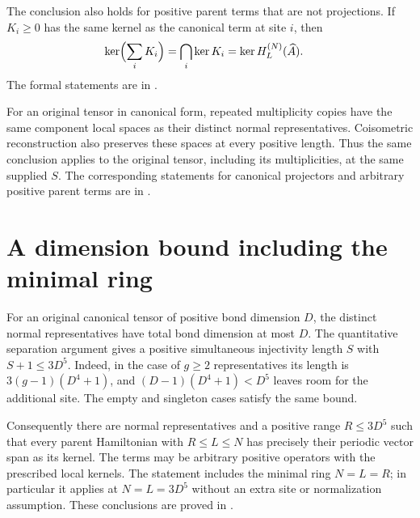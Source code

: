 \documentclass{article}
\begin{document}
The conclusion also holds for positive parent terms that are not
projections. If $K_i\geq0$ has the same kernel as the canonical term at
site $i$, then
\begin{align}
  \ker\Bigl(\sum_i K_i\Bigr)
  &=\bigcap_i\ker K_i=\ker H_L^{(N)}(\widehat A).
  \label{eq:cpgsv21_block_diagonal_parent_ground_space_positive_kernel_sum}
\end{align}
The formal statements are in
.

For an original tensor in canonical form, repeated multiplicity copies
have the same component local spaces as their distinct normal
representatives. Coisometric reconstruction also preserves these spaces
at every positive length. Thus the same conclusion applies to the original
tensor, including its multiplicities, at the same supplied $S$.
The corresponding statements for canonical projectors and arbitrary positive
parent terms are in
.

\section{A dimension bound including the minimal ring}

For an original canonical tensor of positive bond dimension $D$, the distinct
normal representatives have total bond dimension at most $D$. The quantitative
separation argument gives a positive simultaneous injectivity length $S$ with
$S+1\leq3D^5$. Indeed, in the case of $g\geq2$ representatives its length is
$3(g-1)(D^4+1)$, and
$(D-1)(D^4+1)<D^5$ leaves room for the additional site.
The empty and singleton cases satisfy the same bound.

Consequently there are normal representatives and a positive range
$R\leq3D^5$ such that every parent Hamiltonian with $R\leq L\leq N$ has
precisely their periodic vector span as its kernel. The terms may be arbitrary
positive operators with the prescribed local kernels. The statement includes
the minimal ring $N=L=R$; in particular it applies at $N=L=3D^5$ without an
extra site or normalization assumption. These conclusions are proved in
.



\end{document}
